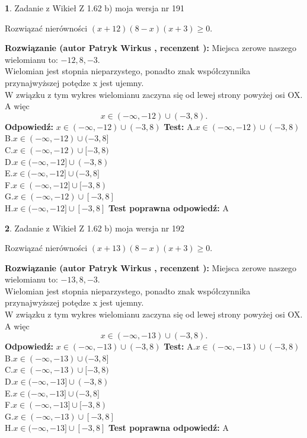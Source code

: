 \documentclass[12pt, a4paper]{article}
\theoremstyle{definition} %
\newtheorem{zad}{}
\newcommand{\zadStart}[1]{\begin{zad}#1\newline}
\newcommand{\zadStop}{\end{zad}}
\newcommand{\rozwStart}[2]{\noindent \textbf{Rozwiązanie (autor #1 , recenzent #2): }\newline}
\newcommand{\rozwStop}{\newline}
\newcommand{\odpStart}{\noindent \textbf{Odpowiedź:}\newline}
\newcommand{\odpStop}{\newline}
\newcommand{\testStart}{\noindent \textbf{Test:}\newline}
\newcommand{\testStop}{\newline}
\newcommand{\kluczStart}{\noindent \textbf{Test poprawna odpowiedź:}\newline}
\newcommand{\kluczStop}{\newline}
\begin{document}
\zadStart{Zadanie z Wikieł Z 1.62 b) moja wersja nr 191}

Rozwiązać nierówności $(x+12)(8-x)(x+3)\ge0$.
\zadStop
\rozwStart{Patryk Wirkus}{}
Miejsca zerowe naszego wielomianu to: $-12, 8, -3$.\\
Wielomian jest stopnia nieparzystego, ponadto znak współczynnika przy\linebreak najwyższej potędze x jest ujemny.\\ W związku z tym wykres wielomianu zaczyna się od lewej strony powyżej osi OX. A więc $$x \in (-\infty,-12) \cup (-3,8).$$
\rozwStop
\odpStart
$x \in (-\infty,-12) \cup (-3,8)$
\odpStop
\testStart
A.$x \in (-\infty,-12) \cup (-3,8)$\\
B.$x \in (-\infty,-12) \cup (-3,8]$\\
C.$x \in (-\infty,-12) \cup [-3,8)$\\
D.$x \in (-\infty,-12] \cup (-3,8)$\\
E.$x \in (-\infty,-12] \cup (-3,8]$\\
F.$x \in (-\infty,-12] \cup [-3,8)$\\
G.$x \in (-\infty,-12) \cup [-3,8]$\\
H.$x \in (-\infty,-12] \cup [-3,8]$
\testStop
\kluczStart
A
\kluczStop



\zadStart{Zadanie z Wikieł Z 1.62 b) moja wersja nr 192}

Rozwiązać nierówności $(x+13)(8-x)(x+3)\ge0$.
\zadStop
\rozwStart{Patryk Wirkus}{}
Miejsca zerowe naszego wielomianu to: $-13, 8, -3$.\\
Wielomian jest stopnia nieparzystego, ponadto znak współczynnika przy\linebreak najwyższej potędze x jest ujemny.\\ W związku z tym wykres wielomianu zaczyna się od lewej strony powyżej osi OX. A więc $$x \in (-\infty,-13) \cup (-3,8).$$
\rozwStop
\odpStart
$x \in (-\infty,-13) \cup (-3,8)$
\odpStop
\testStart
A.$x \in (-\infty,-13) \cup (-3,8)$\\
B.$x \in (-\infty,-13) \cup (-3,8]$\\
C.$x \in (-\infty,-13) \cup [-3,8)$\\
D.$x \in (-\infty,-13] \cup (-3,8)$\\
E.$x \in (-\infty,-13] \cup (-3,8]$\\
F.$x \in (-\infty,-13] \cup [-3,8)$\\
G.$x \in (-\infty,-13) \cup [-3,8]$\\
H.$x \in (-\infty,-13] \cup [-3,8]$
\testStop
\kluczStart
A
\kluczStop
\end{document}
